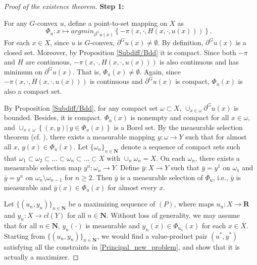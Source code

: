 \documentclass[a4paper, 11pt]{amsart}
\numberwithin{equation}{section}
\theoremstyle{plain}
\theoremstyle{definition}
\theoremstyle{remark}
\newcommand{\R}{\mathbf{R}}
\newcommand{\N}{\mathbf{N}}
\newcommand{\argmin}{\operatornamewithlimits{argmin}}
\begin{document}
\begin{proof}[Proof of the existence theorem]
{\bf Step 1:} %

For any $G$-convex $u$, define a point-to-set mapping on $X$ as
$$\Phi_u: x \longmapsto argmin_{\partial^G u(x)} \left\{-\pi(x, \cdot, H(x,\cdot,u(x)))\right\}.$$ 
For each $x \in X$, since $u$ is $G$-convex, $\partial^G u(x) \neq \emptyset$. By definition,  $\partial^G u(x)$ is a closed set. Moreover, by Proposition \ref{Subdiff/Bdd} it is compact. Since both $-\pi$ and $H$ are continuous, $-\pi(x, \cdot, H(x,\cdot,u(x)))$ is also continuous and has minimum on $\partial^G u(x)$. That is, $\Phi_u(x) \neq \emptyset$. Again, since $-\pi(x, \cdot, H(x,\cdot,u(x)))$ is continuous and $\partial^G u(x)$ is compact, $\Phi_u(x)$ is also a compact set. 


By Proposition \ref{Subdiff/Bdd}, for any compact set $\omega \subset X$, $\cup_{x \in \omega} \partial^G u(x)$ is %
bounded. Besides, it is compact. $\Phi_u(x)$ is nonempty and compact for all $x\in \omega$, and $\cup_{x \in \omega} \left\{(x, y)|~ y \in \Phi_u(x)\right\}$ is a Borel set. By the measurable selection theorem (cf. \cite[Theorem 1.2, Chapter VIII]{EkelandTemam76}), there exists a measurable mapping $y: \omega \rightarrow Y$ such that for almost all $x$, $y(x) \in \Phi_u(x)$. Let $\{\omega_n\}_{n\in \N}%
	$ denote a sequence of compact sets such that $\omega_1 \subset \omega_2 \subset ... \subset \omega_n \subset ...\subset X$ with $\cup_{n}\omega_n = X$. On each $\omega_n$, there exists a measurable selection map $y^n: \omega_n \rightarrow Y$. Define $\bar{y}: X \rightarrow Y$ such that $\bar{y} = y^1$ on $\omega_1$ and $\bar{y} = y^n$ on $\omega_n\setminus \omega_{n-1}$ for $n \ge 2$. Then $\bar{y}$ is a measurable selection of $\Phi_u$, i.e., $\bar{y}$ is measurable and $\bar{y}(x)\in \Phi_u(x)$ for almost every $x$. \medskip

Let $\{(u_n, y_n)\}_{n\in \N}$ be a maximizing sequence of $(P)$, where maps $u_n: X\rightarrow \R$ and $y_n: X\rightarrow cl(Y)$ for all $n\in \N$. Without loss of generality, we may assume that for all $n\in \N$, $y_n(\cdot)$ is measurable and $y_n(x) \in \Phi_{u_n}(x)$ for each $x\in X$. Starting from $\{(u_n, y_n)\}_{n\in \N}$, we would find a value-product pair $(u^*, y^*)$ satisfying all the constraints in \eqref{Principal_new_problem}, and show that it is actually a maximizer.\medskip
	

\end{proof}
\end{document}
